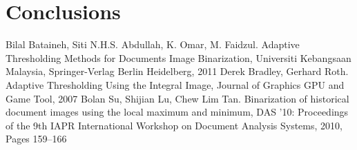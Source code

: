 \documentclass[sigconf]{acmart}
\begin{document}
\begin{table}[htbp]
  \caption{Comparison of the F-measure and the running times of the resolution step of the five best placed teams. The input data for the resolution step consisted of 29{,}787 in JSON formatted e-commerce websites. Measurements were taken on a
laptop running Ubuntu 19.04 with 16 GB of RAM and two Intel Core i5-4310U CPUs. The underlying SSD was a 500\,GB 860 EVO mSATA. We cleared the page cache, dentries, and inodes before each run to avoid reading the input data from RAM instead of the SSD.}
  \label{tab:results}
\end{table}


\section{Conclusions}

\begin{thebibliography}{20}
Bilal Bataineh, Siti N.H.S. Abdullah, K. Omar, M. Faidzul. Adaptive Thresholding Methods for Documents Image Binarization, Universiti Kebangsaan Malaysia,  Springer-Verlag Berlin Heidelberg, 2011
Derek Bradley, Gerhard Roth. Adaptive Thresholding Using the Integral Image, Journal of Graphics GPU and Game Tool, 2007
Bolan Su, Shijian Lu, Chew Lim Tan. Binarization of historical document images using the local maximum and minimum, DAS '10: Proceedings of the 9th IAPR International Workshop on Document Analysis Systems, 2010, Pages 159–166

\end{thebibliography}
\end{document}
